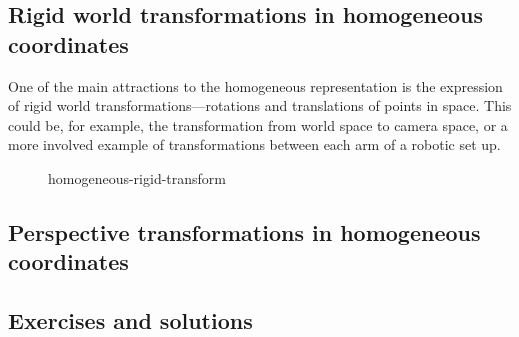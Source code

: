 \documentclass[draft]{CVCN}
\begin{document}
\subsection{Rigid world transformations in homogeneous coordinates}

One of the main attractions to the homogeneous representation is the expression of rigid world transformations---rotations and translations of points in space. This could be, for example, the transformation from world space to camera space, or a more involved example of transformations between each arm of a robotic set up.

\begin{figure}
    \centering
    
    \caption{homogeneous-rigid-transform}
    \label{fig:homogeneous-rigid-transform}
\end{figure}

\subsection{Perspective transformations in homogeneous coordinates}


\subsection{Exercises and solutions}

\printsolutions
\end{document}
